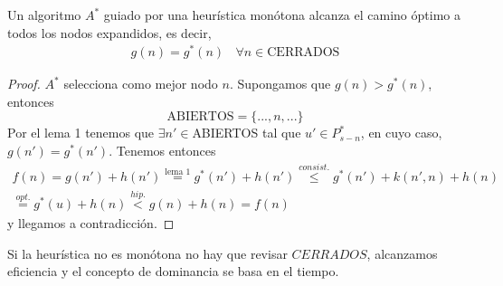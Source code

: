 \begin{teo}
    Un algoritmo $A^*$ guiado por una heurística monótona alcanza el camino óptimo a todos los nodos expandidos, es decir, 
    \begin{gather*}
        g(n) = g^*(n)\ \ \ \ \forall n \in \text{CERRADOS}
    \end{gather*}
    \begin{proof}
        $A^*$ selecciona como mejor nodo $n$. Supongamos que $g(n)>g^*(n)$, entonces 
        \begin{equation*}
            \text{ABIERTOS} = \{..., n, ...\}
        \end{equation*}
        Por el lema 1 tenemos que $\exists n'\in$ABIERTOS tal que $u'\in P^*_{s-n}$, en cuyo caso, $g(n')=g^*(n')$. Tenemos entonces
        \begin{gather*}
            f(n) = g(n') + h(n') \overset{\text{lema 1}}{=} g^*(n') + h(n') \overset{consist.}{\leq} g^*(n') + k(n',n) + h(n) \\
            \overset{opt.}{=} g^*(u)+h(n) \overset{hip.}{<} g(n)+h(n)=f(n)
        \end{gather*}
        y llegamos a contradicción.
    \end{proof}
\end{teo}

\begin{observacion}
    Si la heurística no es monótona no hay que revisar $CERRADOS$, alcanzamos eficiencia y el concepto de dominancia se basa en el tiempo.
\end{observacion}